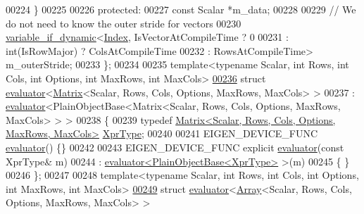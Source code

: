 \begin{DoxyCode}
00224   \}
00225 
00226 \textcolor{keyword}{protected}:
00227   \textcolor{keyword}{const} Scalar *m\_data;
00228 
00229   \textcolor{comment}{// We do not need to know the outer stride for vectors}
00230   \hyperlink{class_eigen_1_1internal_1_1variable__if__dynamic}{variable\_if\_dynamic}<\hyperlink{namespace_eigen_a62e77e0933482dafde8fe197d9a2cfde}{Index}, IsVectorAtCompileTime  ? 0 
00231                                                     : int(IsRowMajor) ? ColsAtCompileTime 
00232                                                     : RowsAtCompileTime> m\_outerStride;
00233 \};
00234 
00235 \textcolor{keyword}{template}<\textcolor{keyword}{typename} Scalar, \textcolor{keywordtype}{int} Rows, \textcolor{keywordtype}{int} Cols, \textcolor{keywordtype}{int} Options, \textcolor{keywordtype}{int} MaxRows, \textcolor{keywordtype}{int} MaxCols>
\hyperlink{struct_eigen_1_1internal_1_1evaluator_3_01_matrix_3_01_scalar_00_01_rows_00_01_cols_00_01_optionc8e41d58a4f0b7a4fe2e5592b375183d}{00236} \textcolor{keyword}{struct }\hyperlink{struct_eigen_1_1internal_1_1evaluator}{evaluator}<\hyperlink{group___core___module_class_eigen_1_1_matrix}{Matrix}<Scalar, Rows, Cols, Options, MaxRows, MaxCols> >
00237   : \hyperlink{struct_eigen_1_1internal_1_1evaluator}{evaluator}<PlainObjectBase<Matrix<Scalar, Rows, Cols, Options, MaxRows, MaxCols> > >
00238 \{
00239   \textcolor{keyword}{typedef} \hyperlink{group___core___module_class_eigen_1_1_matrix}{Matrix<Scalar, Rows, Cols, Options, MaxRows, MaxCols>}
       \hyperlink{group___core___module_class_eigen_1_1_matrix}{XprType};
00240   
00241   EIGEN\_DEVICE\_FUNC \hyperlink{struct_eigen_1_1internal_1_1evaluator}{evaluator}() \{\}
00242 
00243   EIGEN\_DEVICE\_FUNC \textcolor{keyword}{explicit} \hyperlink{struct_eigen_1_1internal_1_1evaluator}{evaluator}(\textcolor{keyword}{const} XprType& m)
00244     : \hyperlink{struct_eigen_1_1internal_1_1evaluator}{evaluator<PlainObjectBase<XprType>} >(m) 
00245   \{ \}
00246 \};
00247 
00248 \textcolor{keyword}{template}<\textcolor{keyword}{typename} Scalar, \textcolor{keywordtype}{int} Rows, \textcolor{keywordtype}{int} Cols, \textcolor{keywordtype}{int} Options, \textcolor{keywordtype}{int} MaxRows, \textcolor{keywordtype}{int} MaxCols>
\hyperlink{struct_eigen_1_1internal_1_1evaluator_3_01_array_3_01_scalar_00_01_rows_00_01_cols_00_01_options211222ab89c0f0e9e4e97c28137aec40}{00249} \textcolor{keyword}{struct }\hyperlink{struct_eigen_1_1internal_1_1evaluator}{evaluator}<\hyperlink{group___core___module_class_eigen_1_1_array}{Array}<Scalar, Rows, Cols, Options, MaxRows, MaxCols> >

\end{DoxyCode}
